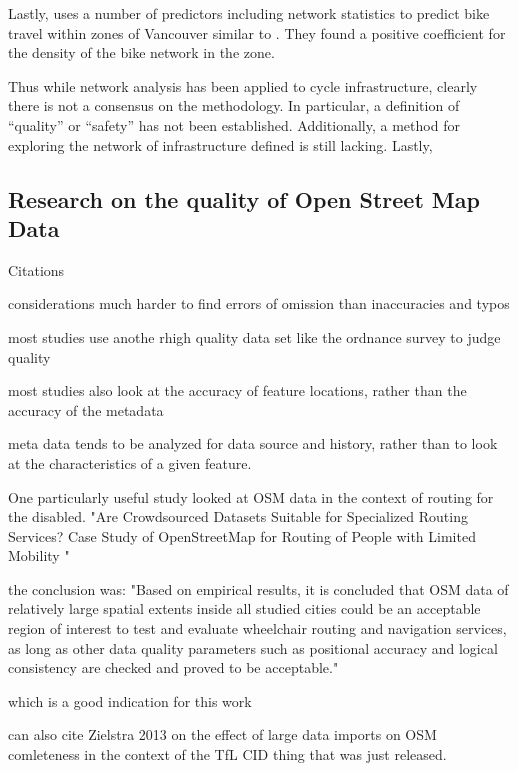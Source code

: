 \documentclass[11pt]{article} %
\begin{document}
Lastly, \cite{osama2017models} uses a number of predictors including network statistics to predict bike travel within zones of Vancouver similar to \cite{schoner2014missing}. They found a positive coefficient for the density of the bike network in the zone. 

Thus while network analysis has been applied to cycle infrastructure, clearly there is not a consensus on the methodology. In particular, a definition of ``quality'' or ``safety'' has not been established. Additionally, a method for exploring the network of infrastructure defined is still lacking. Lastly,  


\subsection{Research on the quality of Open Street Map Data}

Citations

considerations
much harder to find errors of omission than inaccuracies and typos

most studies use anothe rhigh quality data set like the ordnance survey to judge quality

most studies also look at the accuracy of feature locations, rather than the accuracy of the metadata

meta data tends to be analyzed for data source and history, rather than to look at the characteristics of a given feature. 

One particularly useful study looked at OSM data in the context of routing for the disabled. "Are Crowdsourced Datasets Suitable for Specialized Routing Services? Case Study of OpenStreetMap for Routing of People with Limited Mobility "

the conclusion was: "Based on empirical results, it is concluded that OSM data of relatively large spatial extents inside all studied cities could be an acceptable region of interest to test and evaluate wheelchair routing and navigation services, as long as other data quality parameters such as positional accuracy and logical consistency are checked and proved to be acceptable."  

which is a good indication for this work 

can also cite Zielstra 2013 on the effect of large data imports on OSM comleteness in the context of the TfL CID thing that was just released. 

\end{document}
